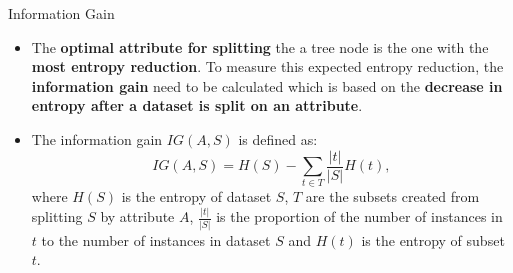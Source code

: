 \documentclass[document.tex]{subfiles}
\begin{document}
    \begin{frame}{Information Gain}
        \begin{itemize}
            \item The \textbf{optimal attribute for splitting} the a tree node is the one with the \textbf{most entropy reduction}. To measure this expected entropy reduction, the \textbf{information gain} need to be calculated which is based on the \textbf{decrease in entropy after a dataset is split on an attribute}. 
            \item The information gain $IG(A, S)$ is defined as:
            $$
            IG(A, S) = H(S) - \sum_{t \in T} \frac{|t|}{|S|}H(t),
            $$
            where $H(S)$ is the entropy of dataset $S$, $T$ are the subsets created from splitting $S$ by attribute $A$, $\frac{|t|}{|S|}$ is the proportion of the number of instances in $t$ to the number of instances in dataset $S$ and $H(t)$ is the entropy of subset $t$.
        \end{itemize}
    \end{frame}    
    
\end{document}
